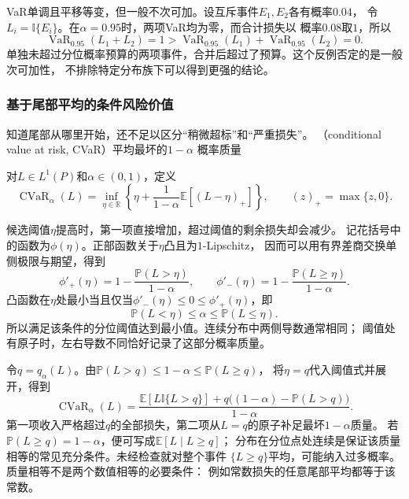 VaR单调且平移等变，但一般不次可加。设互斥事件$E_1,E_2$各有概率$0.04$，
令$L_i=\mathbb I\{E_i\}$。在$\alpha=0.95$时，两项VaR均为零，而合计损失以
概率$0.08$取$1$，所以
\[
  \operatorname{VaR}_{0.95}(L_1+L_2)=1
  >\operatorname{VaR}_{0.95}(L_1)+\operatorname{VaR}_{0.95}(L_2)=0.
\]
单独未超过分位概率预算的两项事件，合并后超过了预算。这个反例否定的是一般次可加性，
不排除特定分布族下可以得到更强的结论。

\subsubsection{基于尾部平均的条件风险价值}

知道尾部从哪里开始，还不足以区分“稍微超标”和“严重损失”。
（conditional value at risk, CVaR）平均最坏的$1-\alpha$
概率质量
\begin{definition}[条件风险价值]
\label{def:decision-conditional-value-at-risk}
对$L\in L^1(P)$和$\alpha\in(0,1)$，定义
\begin{equation}
  \operatorname{CVaR}_\alpha(L)
  =\inf_{\eta\in\mathbb R}
    \left\{\eta+\frac{1}{1-\alpha}\mathbb E[(L-\eta)_+]\right\},
  \qquad (z)_+=\max\{z,0\}.
  \label{eq:decision-cvar-optimization}
\end{equation}
\end{definition}
候选阈值$\eta$提高时，第一项直接增加，超过阈值的剩余损失却会减少。
记花括号中的函数为$\phi(\eta)$。正部函数关于$\eta$凸且为$1$-Lipschitz，
因而可以用有界差商交换单侧极限与期望，得到
\[
  \phi'_+(\eta)=1-\frac{\mathbb P(L>\eta)}{1-\alpha},\qquad
  \phi'_-(\eta)=1-\frac{\mathbb P(L\geq\eta)}{1-\alpha}.
\]
凸函数在$\eta$处最小当且仅当$\phi'_-(\eta)\leq0\leq\phi'_+(\eta)$，即
\begin{equation}
  \mathbb P(L<\eta)\leq\alpha\leq\mathbb P(L\leq\eta).
  \label{eq:decision-cvar-quantile-condition}
\end{equation}
所以满足该条件的分位阈值达到最小值。连续分布中两侧导数通常相同；
阈值处有原子时，左右导数不同恰好记录了这部分概率质量。

令$q=q_\alpha(L)$。由$\mathbb P(L>q)\leq1-\alpha\leq\mathbb P(L\geq q)$，
将$\eta=q$代入阈值式并展开，得到
\begin{equation}
  \operatorname{CVaR}_\alpha(L)=
  \frac{\mathbb E[L\mathbb I\{L>q\}]
    +q\bigl((1-\alpha)-\mathbb P(L>q)\bigr)}{1-\alpha}.
  \label{eq:decision-cvar-atomic-tail}
\end{equation}
第一项收入严格超过$q$的全部损失，第二项从$L=q$的原子补足最坏$1-\alpha$质量。
若$\mathbb P(L\geq q)=1-\alpha$，便可写成$\mathbb E[L\mid L\geq q]$；
分布在分位点处连续是保证该质量相等的常见充分条件。未经检查就对整个事件
$\{L\geq q\}$平均，可能纳入过多概率。质量相等不是两个数值相等的必要条件：
例如常数损失的任意尾部平均都等于该常数。

